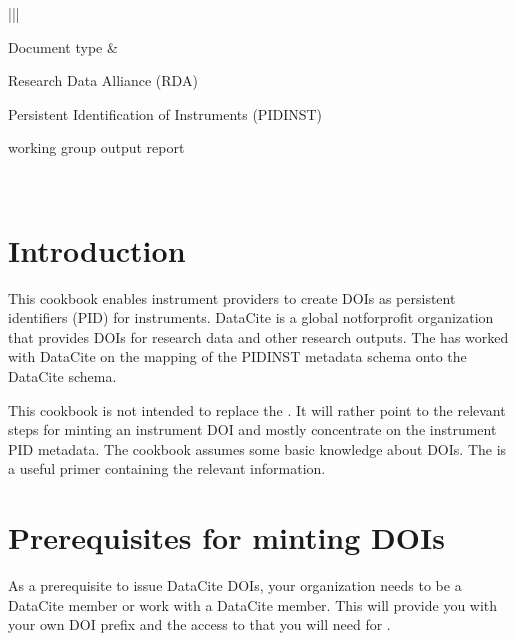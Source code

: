 \documentclass[a4paper,10pt,english]{sphinxmanual}
\begin{document}
\begin{savenotes}\sphinxattablestart
\centering
\begin{tabular}[t]{|*{2}{|}}
\hline

\sphinxAtStartPar
Document type
&
\begin{DUlineblock}{0em}
\item[] Research Data Alliance (RDA)
\item[] Persistent Identification of Instruments (PIDINST)
\item[] working group output report
\end{DUlineblock}
\\
\hline
\end{tabular}
\par
\sphinxattableend\end{savenotes}


\section{Introduction}
\label{\detokenize{datacite-cookbook/intro:introduction}}\label{\detokenize{datacite-cookbook/intro::doc}}
\sphinxAtStartPar
This cookbook enables instrument providers to create  DOIs
as persistent identifiers (PID) for instruments.  DataCite is a global
not\sphinxhyphen{}for\sphinxhyphen{}profit organization that provides DOIs for research data and
other research outputs.  The  has worked with DataCite on the mapping of
the PIDINST metadata schema onto the DataCite schema.

\sphinxAtStartPar
This cookbook is not intended to replace the .  It will rather point to the relevant steps for
minting an instrument DOI and mostly concentrate on the instrument PID
metadata.  The cookbook assumes some basic knowledge about DOIs.  The
 is a useful primer containing
the relevant information.


\section{Prerequisites for minting DOIs}
\label{\detokenize{datacite-cookbook/prereq:prerequisites-for-minting-dois}}\label{\detokenize{datacite-cookbook/prereq::doc}}
\sphinxAtStartPar
As a prerequisite to issue DataCite DOIs, your organization needs to
be a DataCite member or work with a DataCite member.  This will
provide you with your own DOI prefix and the access to
 that you will need for
{\hyperref[\detokenize{datacite-cookbook/minting:datacite-cookbook-minting}]{}}.
\end{document}
